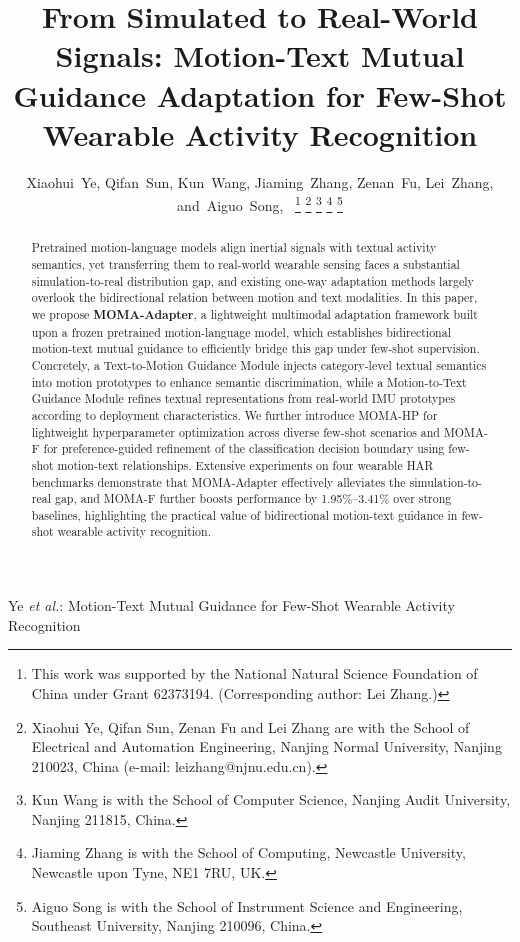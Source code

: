 \documentclass[journal]{IEEEtran}
\begin{document}
\title{From Simulated to Real-World Signals: Motion-Text Mutual Guidance Adaptation for Few-Shot Wearable Activity Recognition}

\author{
Xiaohui~Ye,
Qifan~Sun,
Kun~Wang,
Jiaming~Zhang,
Zenan~Fu,
Lei~Zhang,
and~Aiguo~Song,~
\thanks{This work was supported by the National Natural Science Foundation of China under Grant 62373194. (Corresponding author: Lei Zhang.)}%
\thanks{Xiaohui Ye, Qifan Sun, Zenan Fu and Lei Zhang are with the School of Electrical and Automation Engineering, Nanjing Normal University, Nanjing 210023, China (e-mail: leizhang@njnu.edu.cn).}%
\thanks{Kun Wang is with the School of Computer Science, Nanjing Audit University, Nanjing 211815, China.}%
\thanks{Jiaming Zhang is with the School of Computing, Newcastle University, Newcastle upon Tyne, NE1 7RU, UK.}%
\thanks{Aiguo Song is with the School of Instrument Science and Engineering, Southeast University, Nanjing 210096, China.}%
}

%
{Ye \MakeLowercase{\textit{et al.}}: Motion-Text Mutual Guidance for Few-Shot Wearable Activity Recognition}

\maketitle

\begin{abstract}
Pretrained motion-language models align inertial signals with textual activity semantics, yet transferring them to real-world wearable sensing faces a substantial simulation-to-real distribution gap, and existing one-way adaptation methods largely overlook the bidirectional relation between motion and text modalities. In this paper, we propose \textbf{MOMA-Adapter}, a lightweight multimodal adaptation framework built upon a frozen pretrained motion-language model, which establishes bidirectional motion-text mutual guidance to efficiently bridge this gap under few-shot supervision. Concretely, a Text-to-Motion Guidance Module injects category-level textual semantics into motion prototypes to enhance semantic discrimination, while a Motion-to-Text Guidance Module refines textual representations from real-world IMU prototypes according to deployment characteristics. We further introduce MOMA-HP for lightweight hyperparameter optimization across diverse few-shot scenarios and MOMA-F for preference-guided refinement of the classification decision boundary using few-shot motion-text relationships. Extensive experiments on four wearable HAR benchmarks demonstrate that MOMA-Adapter effectively alleviates the simulation-to-real gap, and MOMA-F further boosts performance by 1.95\%--3.41\% over strong baselines, highlighting the practical value of bidirectional motion-text guidance in few-shot wearable activity recognition.
\end{abstract}
\end{document}
